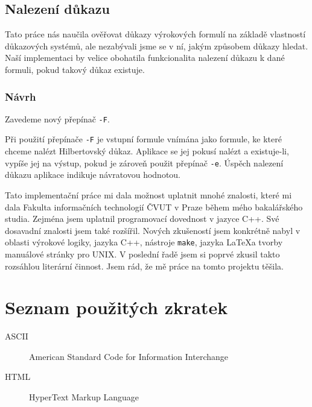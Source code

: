 \documentclass[thesis=B,czech,hidelinks]{FITthesis}[2012/06/26]
\begin{document}
\section{Nalezení důkazu}

Tato práce nás naučila ověřovat důkazy výrokových formulí na základě vlastností důkazových systémů, ale nezabývali jsme se v ní, jakým způsobem důkazy hledat. Naší implementaci by velice obohatila funkcionalita nalezení důkazu k dané formuli, pokud takový důkaz existuje.

\subsection{Návrh}

Zavedeme nový přepínač \texttt{-F}.

Při použití přepínače \texttt{-F} je vstupní formule vnímána jako formule, ke které chceme nalézt Hilbertovský důkaz. Aplikace se jej pokusí nalézt a existuje-li, vypíše jej na výstup, pokud je zároveň použit přepínač \texttt{-e}. Úspěch nalezení důkazu aplikace indikuje návratovou hodnotou.

%
%
%

\begin{conclusion}
Tato implementační práce mi dala možnost uplatnit mnohé znalosti, které mi dala Fakulta informačních technologií ČVUT v Praze během mého bakalářského studia. Zejména jsem uplatnil programovací dovednost v jazyce C++. Své dosavadní znalosti jsem také rozšířil. Nových zkušeností jsem konkrétně nabyl v oblasti výrokové logiky, jazyka C++, nástroje \texttt{make}, jazyka \LaTeX a tvorby manuálové stránky pro UNIX. V poslední řadě jsem si poprvé zkusil takto rozsáhlou literární činnost. Jsem rád, že mě práce na tomto projektu těšila.
\end{conclusion}

%
%
%




\appendix

%
%
%

\chapter{Seznam použitých zkratek}

\begin{description}
	\item[ASCII] American Standard Code for Information Interchange
	\item[HTML] HyperText Markup Language
\end{description}
\end{document}
